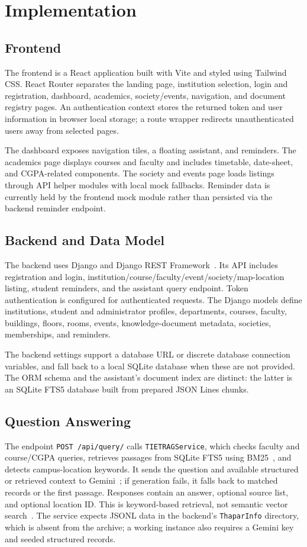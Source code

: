 \documentclass[11pt,a4paper]{report}
\begin{document}
\chapter{Implementation}

\section{Frontend}
The frontend is a React application built with Vite and styled using Tailwind
CSS. React Router separates the landing page, institution selection, login and
registration, dashboard, academics, society/events, navigation, and document
registry pages. An authentication context stores the returned token and user
information in browser local storage; a route wrapper redirects unauthenticated
users away from selected pages.

The dashboard exposes navigation tiles, a floating assistant, and reminders.
The academics page displays courses and faculty and includes timetable,
date-sheet, and CGPA-related components. The society and events page loads
listings through API helper modules with local mock fallbacks. Reminder data is
currently held by the frontend mock module rather than persisted via the
backend reminder endpoint.

\section{Backend and Data Model}
The backend uses Django and Django REST Framework~\cite{drfdocs}. Its API includes registration
and login, institution/course/faculty/event/society/map-location listing,
student reminders, and the assistant query endpoint. Token authentication is
configured for authenticated requests. The Django models define institutions,
student and administrator profiles, departments, courses, faculty, buildings,
floors, rooms, events, knowledge-document metadata, societies, memberships,
and reminders.

The backend settings support a database URL or discrete database connection
variables, and fall back to a local SQLite database when these are not
provided. The ORM schema and the assistant's document index are distinct:
the latter is an SQLite FTS5 database built from prepared JSON Lines chunks.

\section{Question Answering}
The endpoint \texttt{POST /api/query/} calls \texttt{TIETRAGService}, which
checks faculty and course/CGPA queries, retrieves passages from SQLite FTS5
using BM25~\cite{sqlitefts5}, and detects campus-location keywords. It sends the
question and available structured or retrieved context to Gemini~\cite{geminiapi};
if generation fails, it falls back to matched records or the first passage.
Responses contain an answer, optional source list, and optional location ID.
This is keyword-based retrieval, not semantic vector search~\cite{lewis2020rag}.
The service expects JSONL data in the backend's \texttt{ThaparInfo} directory,
which is absent from the archive; a working instance also requires a Gemini key
and seeded structured records.
\end{document}
